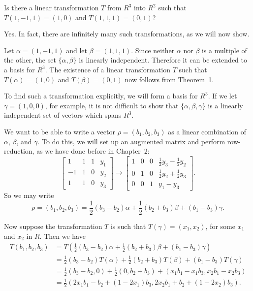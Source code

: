  Is there a linear transformation $T$ from $R^3$ into $R^2$
such that $T(1, -1, 1) = (1, 0)$ and $T(1, 1, 1) = (0, 1)$?
\begin{solution}
  Yes. In fact, there are infinitely many such transformations, as we
  will now show.

  Let $\alpha = (1, -1, 1)$ and let $\beta = (1, 1, 1)$. Since neither
  $\alpha$ nor $\beta$ is a multiple of the other, the set
  $\{\alpha, \beta\}$ is linearly independent. Therefore it can be
  extended to a basis for $R^3$. The existence of a linear
  transformation $T$ such that $T(\alpha) = (1, 0)$ and
  $T(\beta) = (0, 1)$ now follows from Theorem~1.

  To find such a transformation explicitly, we will form a basis for
  $R^3$. If we let $\gamma = (1, 0, 0)$, for example, it is not
  difficult to show that $\{\alpha, \beta, \gamma\}$ is a linearly
  independent set of vectors which spans $R^3$.

  We want to be able to write a vector $\rho = (b_1, b_2, b_3)$ as a
  linear combination of $\alpha$, $\beta$, and $\gamma$. To do this,
  we will set up an augmented matrix and perform row-reduction, as we
  have done before in Chapter~2:
  \begin{equation*}
    \begin{bmatrix}
      1 & 1 & 1 & y_1 \\
      -1 & 1 & 0 & y_2 \\
      1 & 1 & 0 & y_3
    \end{bmatrix}
    \rightarrow
    \begin{bmatrix}
      1 & 0 & 0 & \frac12y_3 - \frac12y_2 \\[3pt]
      0 & 1 & 0 & \frac12y_2 + \frac12y_3 \\[3pt]
      0 & 0 & 1 & y_1 - y_3
    \end{bmatrix}.
  \end{equation*}
  So we may write
  \begin{equation*}
    \rho = (b_1, b_2, b_3) =
    \frac12(b_3 - b_2)\alpha + \frac12(b_2 + b_3)\beta
    + (b_1 - b_3)\gamma.
  \end{equation*}

  Now suppose the transformation $T$ is such that
  $T(\gamma) = (x_1, x_2)$, for some $x_1$ and $x_2$ in $R$. Then we
  have
  \begin{align*}
    T(b_1, b_2, b_3)
    &= T\left(\frac12(b_3 - b_2)\alpha + \frac12(b_2 + b_3)\beta
      + (b_1 - b_3)\gamma\right) \\[3pt]
    &= \frac12(b_3 - b_2)T(\alpha) + \frac12(b_2 + b_3)T(\beta)
      + (b_1 - b_3)T(\gamma) \\[3pt]
    &= \frac12(b_3 - b_2, 0) + \frac12(0, b_2 + b_3)
      + (x_1b_1 - x_1b_3, x_2b_1 - x_2b_3) \\[3pt]
    &= \frac12(2x_1b_1 - b_2 + (1 - 2x_1)b_3,
      2x_2b_1 + b_2 + (1 - 2x_2)b_3).
  \end{align*}


\end{solution}

